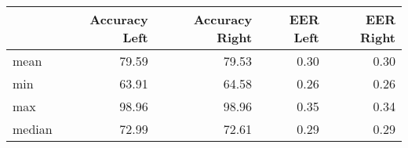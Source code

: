 \begin{tabular}{lrrrr}
\toprule
{} &  Accuracy Left &  Accuracy Right &  EER Left &  EER Right \\
\midrule
mean   &          79.59 &           79.53 &      0.30 &       0.30 \\
min    &          63.91 &           64.58 &      0.26 &       0.26 \\
max    &          98.96 &           98.96 &      0.35 &       0.34 \\
median &          72.99 &           72.61 &      0.29 &       0.29 \\
\bottomrule
\end{tabular}
